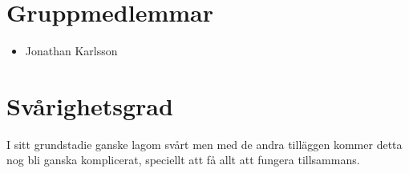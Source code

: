 \documentclass[a4paper]{article}
\begin{document}
	\section{Gruppmedlemmar}
	\begin{itemize}
	\item Jonathan Karlsson
	\end{itemize}
	
	\section{Svårighetsgrad}
	I sitt grundstadie ganske lagom svårt men med de andra tilläggen kommer detta nog bli ganska komplicerat, speciellt att få allt att fungera tillsammans.
	
	
\end{document}
